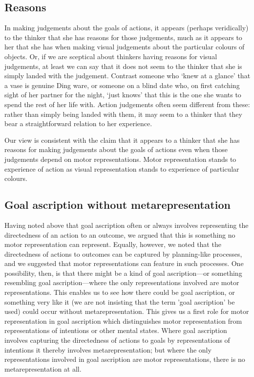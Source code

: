 \documentclass[12pt,\papersize]{extarticle}
\begin{document}
\subsection{Reasons}
In making judgements about the goals of actions, it appears (perhaps veridically) to the thinker that she has reasons for those judgements, much as it appears to her that she has when making visual judgements about the particular colours of objects.  Or, if we are sceptical about thinkers having reasons for visual judgements, at least we can say that it does not seem to the thinker that she is simply landed with the judgement.  Contrast someone who `knew at a glance' that a vase is genuine Ding ware, or someone on a blind date who, on first catching sight of her partner for the night, `just knows' that this is the one she wants to spend the rest of her life with.  Action judgements often seem different from these: rather than simply being landed with them, it may seem to a thinker that they bear a straightforward relation to her experience. 

Our view is consistent with the claim that it appears to a thinker that she has reasons for making judgements about the goals of actions even when  those judgements depend on motor representations.
  Motor representation stands to experience of action as visual representation stands to experience of particular colours. 


\subsection{Goal ascription without metarepresentation}
Having noted above that goal ascription often or always involves representing the directedness of an action to an outcome, we argued that this is something no motor representation can represent. Equally, however, we noted that the directedness of actions to outcomes can be captured by planning-like processes, and we suggested that motor representations can feature in such processes.  One possibility, then, is that there might be a kind of goal ascription---or something resembling goal ascription---where the only representations involved are motor representations.  This enables us to see how there could be goal ascription, or something very like it (we are not insisting that the term 'goal ascription' be used) could occur without metarepresentation. This gives us a first role for motor representation in goal ascription which distinguishes motor representation from representations of intentions or other mental states.  Where goal ascription involves capturing the directedness of actions to goals by representations of intentions it thereby involves metarepresentation; but where the only representations involved in goal ascription are motor representations, there is no metarepresentation at all.
\end{document}
